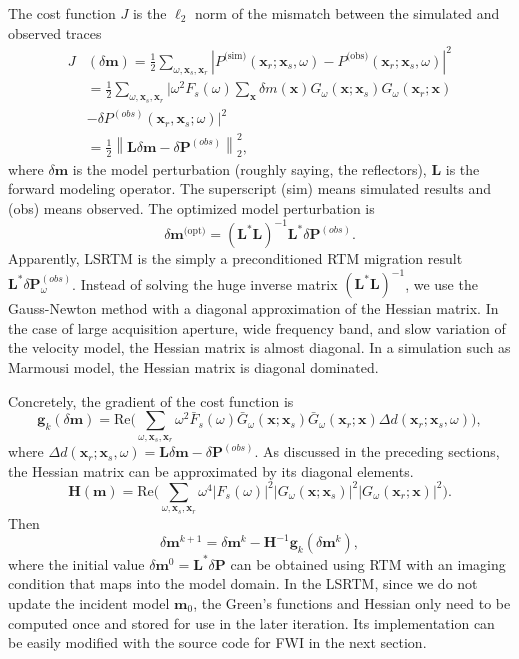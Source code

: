 \documentclass[11pt,titlepage]{article}
\newcommand{\bx}{\boldsymbol{x}}
\newcommand{\bg}{\boldsymbol{g}}
\newcommand{\bH}{\boldsymbol{H}}
\newcommand{\bL}{\boldsymbol{L}}
\newcommand{\bm}{\boldsymbol{m}}
\newcommand{\bP}{\boldsymbol{P}}
\theoremstyle{plain}
\theoremstyle{definition}
\theoremstyle{remark}
\numberwithin{equation}{section}
\begin{document}
The cost function $J$ is the $\ell_2$ norm of the mismatch between the simulated and observed traces
  \begin{equation}
  \begin{aligned}
  J&(\delta \bm) = \frac{1}{2} \sum\limits_{\omega,\bx_s,\bx_r}  \left| P^{\text{(sim)}}(\bx_r; \bx_s,  \omega) - P^{\text{(obs)}}(\bx_r; \bx_s, \omega) \right|^2 \\
  &= \frac{1}{2} \sum\limits_{\omega,\bx_s,\bx_r} \Big| \omega^2 F_s(\omega) \sum\limits_{\bx}\delta m(\bx)G_{\omega}(\bx; \bx_s)G_{\omega}(\bx_r; \bx) \\&- \delta P^{(obs)}(\bx_r, \bx_s; \omega) \Big|^2\\
  &= \frac{1}{2} \left\| \bL\delta \bm - \delta\bP^{(obs)}\right\|_2^2,
  \end{aligned}
  \end{equation}
  where $\delta \bm$ is the model perturbation (roughly saying, the reflectors), $\bL$ is the forward modeling operator. The superscript (sim) means simulated results and (obs) means
  observed. The optimized model perturbation is 
    \begin{equation}
    \delta \bm^{\text{(opt)}} = \left( \bL^{*}\bL \right)^{-1} \bL^{*} \delta\bP^{(obs)}.
    \end{equation}
    Apparently, LSRTM is the simply a preconditioned RTM migration result $\bL^{*}\delta \bP^{(obs)}_{\omega}$. 
    Instead of solving the huge inverse matrix $(\bL^{*}\bL)^{-1}$,  we use the Gauss-Newton method with a diagonal approximation 
    of the Hessian matrix. In the case of large acquisition aperture, wide frequency band, and slow variation of the velocity model, the Hessian matrix
    is almost diagonal. In a simulation such as Marmousi model, the Hessian matrix is diagonal dominated. 

Concretely, the gradient of the cost function is
\begin{equation}
\bg_k(\delta\bm)=\text{Re}\bigg(\sum_{\omega,\bx_s,\bx_r } \omega^2  \bar{F}_s(\omega) \bar{G}_\omega(\bx;\bx_s)\bar{ G}_\omega(\bx_r;\bx)\Delta d(\bx_r;\bx_s,\omega)\bigg), 
\end{equation}
where $\Delta d(\bx_r;\bx_s,\omega)=\bL\delta \bm - \delta\bP^{(obs)}$. 
As discussed in the preceding sections, the Hessian matrix can be approximated by its diagonal elements.
\begin{equation}
\bH(\bm)= \text{Re}\bigg( \sum_{\omega,\bx_s,\bx_r} \omega^4 |F_s(\omega)|^2 |G_\omega(\bx;\bx_s)|^2 |G_\omega(\bx_r;\bx)|^2 \bigg).
\end{equation} 
Then
\begin{equation}
\delta \bm^{k+1}=\delta \bm^{k} - \bH^{-1} \bg_k(\delta \bm^k),
\end{equation}
where the initial value $\delta \bm^0=\bL^* \delta \bP$ can be obtained using RTM with an imaging condition that maps into the model domain.
In the LSRTM, since we do not update the incident model $\bm_0$, the Green's functions and Hessian only need to be computed once and stored for use in the later iteration. Its implementation can be easily modified with the source code for FWI in the next section.
\end{document}
